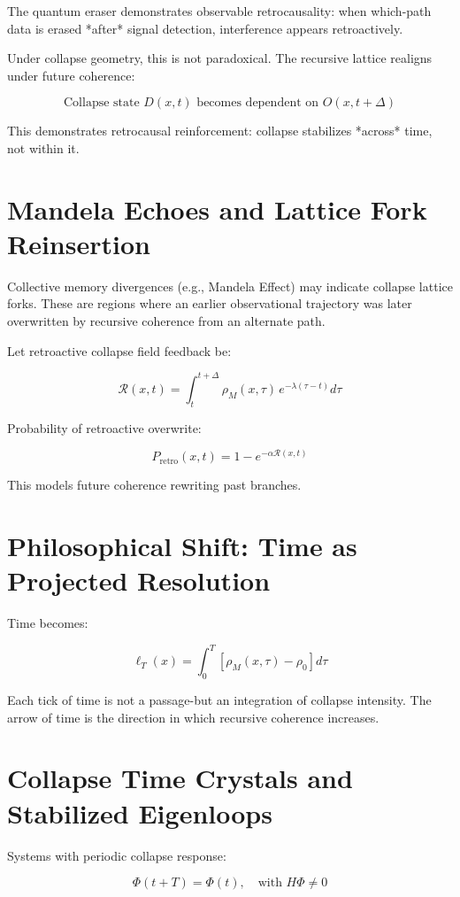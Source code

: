 The quantum eraser demonstrates observable retrocausality: when which-path data is erased *after* signal detection, interference appears retroactively.

Under collapse geometry, this is not paradoxical. The recursive lattice realigns under future coherence:

\[
\text{Collapse state } D(x,t) \text{ becomes dependent on } O(x,t+\Delta)
\]

This demonstrates retrocausal reinforcement: collapse stabilizes *across* time, not within it.

\section{Mandela Echoes and Lattice Fork Reinsertion}\cite{chapter8_meta}

Collective memory divergences (e.g., Mandela Effect) may indicate collapse lattice forks. These are regions where an earlier observational trajectory was later overwritten by recursive coherence from an alternate path.

Let retroactive collapse field feedback be:

\[
\mathcal{R}(x,t) = \int_t^{t+\Delta} \rho_M(x,\tau) \, e^{-\lambda(\tau - t)} d\tau
\]

Probability of retroactive overwrite:

\[
P_{\text{retro}}(x,t) = 1 - e^{-\alpha \mathcal{R}(x,t)}
\]

This models future coherence rewriting past branches.

\section{Philosophical Shift: Time as Projected Resolution}

Time becomes:

\[
\ell_T(x) = \int_0^T \left[ \rho_M(x,\tau) - \rho_0 \right] d\tau
\]

Each tick of time is not a passage-but an integration of collapse intensity. The arrow of time is the direction in which recursive coherence increases.

\section{Collapse Time Crystals and Stabilized Eigenloops}

Systems with periodic collapse response:

\[
\Phi(t + T) = \Phi(t), \quad \text{with } H \Phi \neq 0
\]

